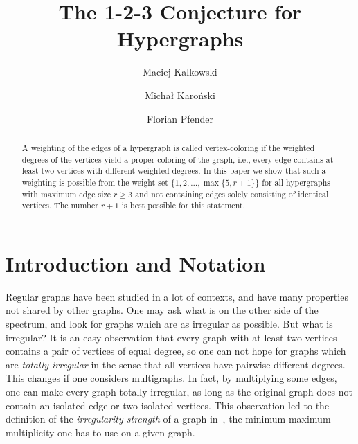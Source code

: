 \documentclass[reqno,12pt,epsf]{amsart}
\title[The 1-2-3 Conjecture for Hypergraphs]
{The 1-2-3 Conjecture for Hypergraphs}
\author[M. Kalkowski]{Maciej Kalkowski}
\author[M. Karo\'nski]{Micha{\l} Karo\'nski}
\author[F. Pfender]{Florian Pfender}
\begin{document}
\begin{abstract}
A weighting of the edges of a hypergraph is called vertex-coloring if the weighted degrees of the vertices
yield a proper coloring of the graph, i.e., every edge contains at least two vertices with different weighted degrees. In this paper we show that such a weighting is possible
from the weight set $\{ 1,2 ,\ldots,\max\{5,r+1\}\}$ for all hypergraphs with maximum edge size $r\ge 3$ and not containing edges solely consisting of identical vertices. The number $r+1$ is best possible for this statement.
\end{abstract}

\maketitle

\section{Introduction and Notation}
Regular graphs have been studied in a lot of contexts, and have many properties not shared by other graphs. One may ask what is on the other side of the spectrum, and look for graphs which are as irregular as possible. But what is irregular? It is an easy observation that every graph with at least two vertices contains a pair of vertices of equal degree, so one can not hope for graphs which are {\em totally irregular} in the sense that all vertices have pairwise different degrees. This changes if one considers multigraphs. In fact, by multiplying some edges, one can make every graph totally irregular, as long as the original graph does not contain an isolated edge or two isolated vertices. This observation led to the definition of the {\em irregularity strength} of a graph in~\cite{CJLORS}, the minimum maximum multiplicity one has to use on a given graph.
\end{document}
